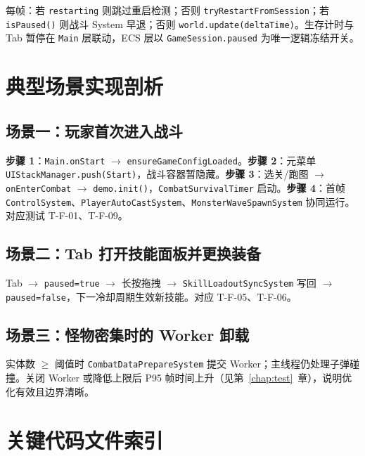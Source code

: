 每帧：若 \texttt{restarting} 则跳过重启检测；否则 \texttt{tryRestartFromSession}；若 \texttt{isPaused()} 则战斗 System 早退；否则 \texttt{world.update(deltaTime)}。生存计时与 Tab 暂停在 \texttt{Main} 层联动，ECS 层以 \texttt{GameSession.paused} 为唯一逻辑冻结开关。

\section{典型场景实现剖析}
\label{sec:scenarios}

\subsection{场景一：玩家首次进入战斗}

\textbf{步骤 1}：\texttt{Main.onStart} $\rightarrow$ \texttt{ensureGameConfigLoaded}。\textbf{步骤 2}：元菜单 \texttt{UIStackManager.push(Start)}，战斗容器暂隐藏。\textbf{步骤 3}：选关/跑图 $\rightarrow$ \texttt{onEnterCombat} $\rightarrow$ \texttt{demo.init()}，\texttt{CombatSurvivalTimer} 启动。\textbf{步骤 4}：首帧 \texttt{ControlSystem}、\texttt{PlayerAutoCastSystem}、\texttt{MonsterWaveSpawnSystem} 协同运行。对应测试 T-F-01、T-F-09。

\subsection{场景二：Tab 打开技能面板并更换装备}

Tab $\rightarrow$ \texttt{paused=true} $\rightarrow$ 长按拖拽 $\rightarrow$ \texttt{SkillLoadoutSyncSystem} 写回 $\rightarrow$ \texttt{paused=false}，下一冷却周期生效新技能。对应 T-F-05、T-F-06。

\subsection{场景三：怪物密集时的 Worker 卸载}

实体数 $\geq$ 阈值时 \texttt{CombatDataPrepareSystem} 提交 Worker；主线程仍处理子弹碰撞。关闭 Worker 或降低上限后 P95 帧时间上升（见第~\ref{chap:test}~章），说明优化有效且边界清晰。

\section{关键代码文件索引}
\label{sec:file-index}

